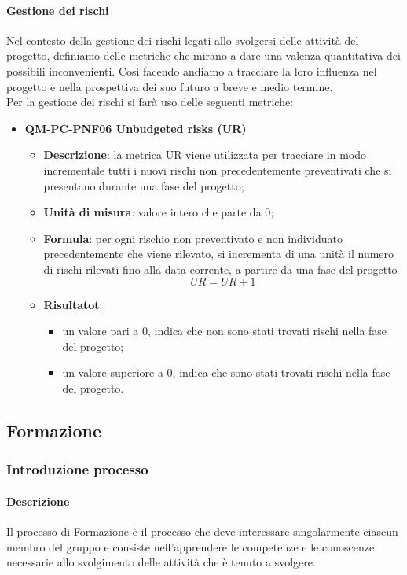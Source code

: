 			\paragraph{Gestione dei rischi}
				Nel contesto della gestione dei rischi legati allo svolgersi delle attività del progetto, definiamo delle metriche che mirano a dare una valenza quantitativa dei possibili inconvenienti. Così facendo andiamo a tracciare la loro influenza nel progetto e nella prospettiva dei suo futuro a breve e medio termine.\\
				Per la gestione dei rischi si farà uso delle seguenti metriche:
				\begin{itemize}
					\item\textbf{QM-PC-PNF06 Unbudgeted risks (UR)}
						\begin{itemize}
							\item\textbf{Descrizione}: la metrica UR viene utilizzata per tracciare in modo incrementale tutti i nuovi rischi non precedentemente preventivati che si presentano durante una fase del progetto;
							\item\textbf{Unità di misura}: valore intero che parte da 0;
							\item\textbf{Formula}: per ogni rischio non preventivato e non individuato precedentemente che viene rilevato, si incrementa di una unità il numero di rischi rilevati fino alla data corrente, a partire da una fase del progetto
								\[UR = UR + 1 \]
							\item\textbf{Risultatot}:
								\begin{itemize}
									\item un valore pari a 0, indica che non sono stati trovati rischi nella fase del progetto;
									\item un valore superiore a 0, indica che sono stati trovati rischi nella fase del progetto.
								\end{itemize}
						\end{itemize}
				\end{itemize}
	\subsection{Formazione}
		\subsubsection{Introduzione processo}
			\paragraph{Descrizione}
				Il processo di Formazione è il processo che deve interessare singolarmente ciascun membro del gruppo e consiste nell’apprendere le competenze e le conoscenze necessarie allo svolgimento delle attività che è tenuto a svolgere.

